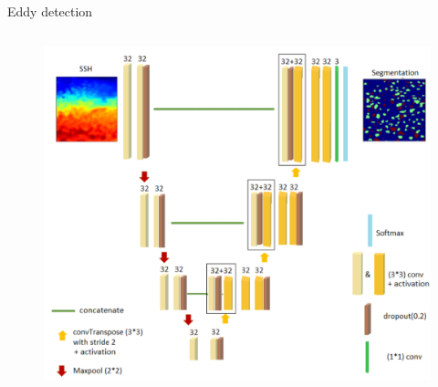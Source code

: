 \documentclass[handout]{beamer}
\newcommand{\rref}[1][]{\hfill{\scriptsize\textit{#1}}}
\begin{document}
\begin{frame}[t]{Eddy detection}
\rref[\cite{Lguensat2017}]
    \begin{columns}
     \begin{figure}
        \centering
         \includegraphics[width=\textwidth]{fig/L3/eddynet.png}
    \end{figure}


\end{columns}
\end{frame}
\end{document}
